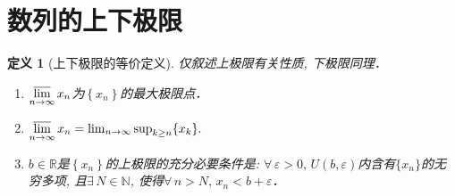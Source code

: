 \documentclass[11pt,a4paper]{ctexart}
\makeatletter
\theoremstyle{thmseries} %
\theoremstyle{exerseries}
\newtheorem{defn}{定义}[section]
\newtheorem{exer}{习题}[section]
\renewenvironment{proof}[1][\proofname]{\par
  \pushQED{\qed}%
  \normalfont \topsep6\p@\@plus6\p@\relax
  \trivlist
  \item[\hskip\labelsep
        \itshape
    #1\@addpunct{}]\ignorespaces
}{%
  \popQED\endtrivlist\@endpefalse
}
\newenvironment{pf}{\begin{proof}[\bfseries\upshape 证\quad]}{\end{proof}}
\newcommand{\bra}[1]{\mathopen{}\left(#1\right)}
\newcommand{\sbra}[1]{\mathopen{}\left[#1\right]}
\newcommand{\cbra}[1]{\mathopen{}\left\{#1\right\}}
\renewcommand{\epsilon}{\varepsilon}
\newcommand{\R}{\mathbb{R}}
\newcommand{\N}{\mathbb{N}}
\def \nti {\mathnormal{n}\to\infty}
\DeclareMathOperator{\ulim}{\underset{\nti}{\overline{\lim}}}
\makeatother
\begin{document}




\section{数列的上下极限}
\begin{defn}[上下极限的等价定义]
仅叙述上极限有关性质, 下极限同理．
\begin{enumerate}
	\item $\ulim x_n$为$\cbra{x_n}$的最大极限点．
	\item $\ulim x_n=\lim_{n\to\infty}\sup_{k\geq n}\{x_k\}.$
	\item $b\in\R$是$\cbra{x_n}$的上极限的充分必要条件是: $\forall\,\epsilon>0,\,U\bra{b,\epsilon}$内含有$\{x_n\}$的无穷多项, 且$\exists\,N\in\N$, 使得$\forall\,n>N,\,x_n<b+\epsilon$．
\end{enumerate}
\end{defn}
\end{document}
